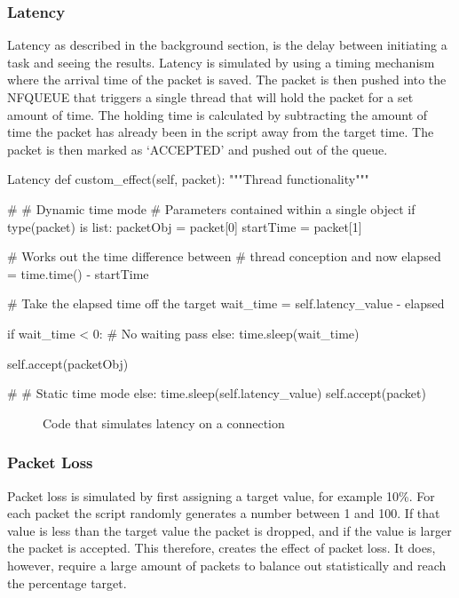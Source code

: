 \subsubsection{Latency}
Latency as described in the background section, is the delay between initiating a task and seeing the results. Latency is simulated by using a timing mechanism where the arrival time of the packet is saved. The packet is then pushed into the NFQUEUE that triggers a single thread that will hold the packet for a set amount of time. The holding time is calculated by subtracting the amount of time the packet has already been in the script away from the target time. The packet is then marked as `ACCEPTED' and pushed out of the queue.

\begin{Code}{Latency}
def custom_effect(self, packet):
	"""Thread functionality"""

	# # Dynamic time mode
	# Parameters contained within a single object
	if type(packet) is list:
		packetObj = packet[0]
		startTime = packet[1]

		# Works out the time difference between
		# thread conception and now
		elapsed = time.time() - startTime
            
		# Take the elapsed time off the target
		wait_time = self.latency_value - elapsed

		if wait_time < 0:
			# No waiting			
			pass
		else:
			time.sleep(wait_time)
			
		self.accept(packetObj)
			
	# # Static time mode
	else:
		time.sleep(self.latency_value)
		self.accept(packet)

\end{Code}
\begin{figure}[h]
	\caption{Code that simulates latency on a connection}
\end{figure}

\subsubsection{Packet Loss}
Packet loss is simulated by first assigning a target value, for example 10\%. For each packet the script randomly generates a number between 1 and 100. If that value is less than the target value the packet is dropped, and if the value is larger the packet is accepted. This therefore, creates the effect of packet loss. It does, however, require a large amount of packets to balance out statistically and reach the percentage target.

